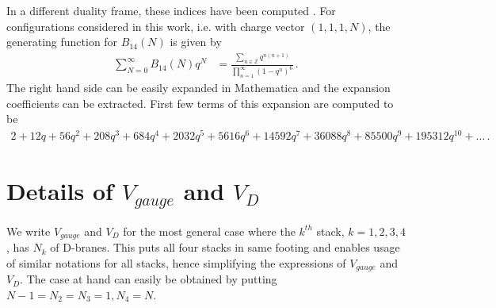 \documentclass[12pt,a4paper]{JHEP3}
\newcommand{\Tr}{\mathop{\mathrm{Tr}}}
\newcommand{\nn}{\ensuremath{\nonumber{}}}
\begin{document}
In a different duality frame, these indices have been computed \cite{Shih:2005qf, Sen:2009gy}.
For configurations considered in this work, i.e. with charge vector $(1,1,1,N)$, 
 the generating function for $B_{14}(N)$ is given by 
\begin{align}
\sum_{N=0}^\infty B_{14}(N) q^N &= \frac{\sum_{n \in \mathbb{Z}} q^{n(n+1)}}{ \prod_{n=1}^\infty (1-q^n)^6} \, .
\end{align}
The right hand side can be easily expanded in Mathematica and the expansion coefficients can be extracted.
First few terms of this expansion are computed to be \cite{Mathematica}
\begin{align}
2+12 q+56 q^2+208 q^3+684 q^4+2032 q^5+5616 q^6+14592 q^7+36088 q^8+85500 q^9+195312 q^{10}+ \dots \, .
\end{align}

\section{Details of $V_{gauge}$ and $V_D $} \label{VgaugeD}
We  write $V_{gauge}$ and $V_D$ for the most general case where the $k^{th}$ stack, $k=1, 2 , 3 , 4$, has $N_k$ of D-branes. This puts all four stacks in same footing and enables usage of similar notations for all stacks, hence simplifying the expressions of $V_{gauge}$ and $V_D$. The case at hand can easily be obtained by putting $N-1=N_2=N_3=1, N_4=N$. 
\end{document}
